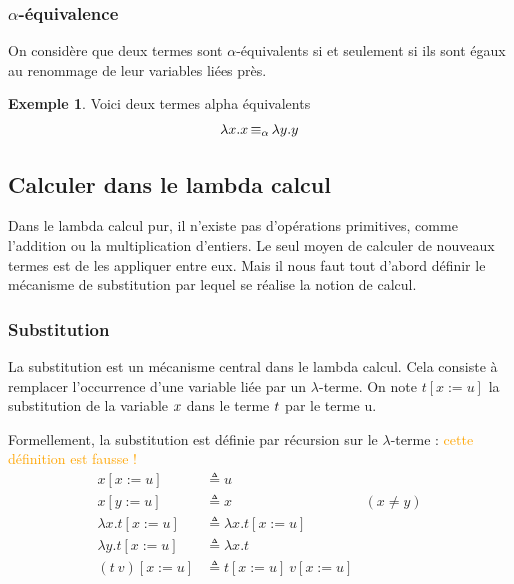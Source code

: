 \documentclass {article}
\theoremstyle{definition}
\newtheorem{example}{Exemple}
\theoremstyle{remark}
\newcommand{\attention}[1]{\textcolor{orange}{#1}}
\begin{document}
\subsubsection{$\alpha$-équivalence}
\label{alpha_equiv}

\newcommand{\equivAlpha}{\mathop{\equiv_\alpha}}

On considère que deux termes sont \(\alpha\)-équivalents si et seulement si ils sont 
égaux au renommage de leur variables liées près. 
\begin{example}
  Voici deux termes alpha équivalents 
  \begin{align*}
    & \Lam{x}{\Var{x}} \equivAlpha \Lam{y}{\Var{y}} \\
  \end{align*}
\end{example}
  
\subsection{Calculer dans le lambda calcul}
\label{calculer_dans_le_lambda_calcul}

Dans le lambda calcul pur, il n'existe pas d'opérations primitives, comme l'addition ou la multiplication d'entiers. Le seul moyen de calculer de nouveaux termes est de les appliquer 
entre eux. Mais il nous faut tout d'abord définir le mécanisme de substitution par lequel se réalise la notion de calcul.

\subsubsection{Substitution}

\newcommand{\subst}[3]{#1[#2 := #3]}


La substitution est un mécanisme central dans le lambda calcul. Cela consiste 
à remplacer l'occurrence d'une variable liée par un \(\lambda\)-terme.
On note \(\subst{t}{x}{u}\) la substitution de la variable $x$ dans le terme $t$ par le 
terme u.

Formellement, la substitution est définie par récursion sur le $\lambda$-terme : \attention{cette définition est fausse !}
\begin{align*}
    \subst{x}{x}{u} &\triangleq u \\
    \subst{x}{y}{u} &\triangleq x & (x \neq y)\\
    \subst{\lambda x.t}{x}{u} &\triangleq \lambda x.\subst{t}{x}{u} \\
    \subst{\lambda y.t}{x}{u} &\triangleq \lambda x.t \\
    \subst{(t\: v)}{x}{u} &\triangleq \subst{t}{x}{u}\: \subst{v}{x}{u}
\end{align*}
\end{document}
